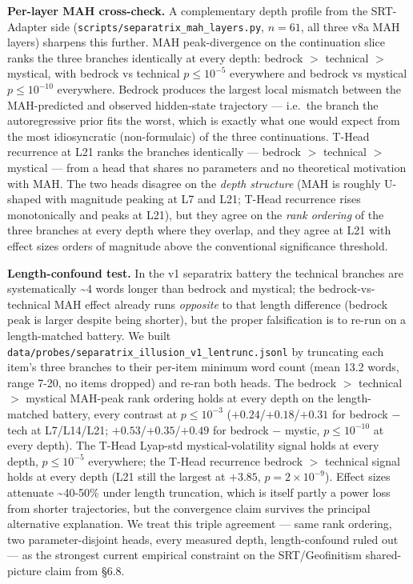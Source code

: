 \documentclass[
  11pt]{article}
\begin{document}
\textbf{Per-layer MAH cross-check.} A complementary depth profile from
the SRT-Adapter side (\texttt{scripts/separatrix\_mah\_layers.py},
\(n = 61\), all three v8a MAH layers) sharpens this further. MAH
peak-divergence on the continuation slice ranks the three branches
identically at every depth: bedrock \(>\) technical \(>\) mystical, with
bedrock vs technical \(p \le 10^{-5}\) everywhere and bedrock vs
mystical \(p \le 10^{-10}\) everywhere. Bedrock produces the largest
local mismatch between the MAH-predicted and observed hidden-state
trajectory --- i.e.~the branch the autoregressive prior fits the worst,
which is exactly what one would expect from the most idiosyncratic
(non-formulaic) of the three continuations. T-Head recurrence at L21
ranks the branches identically --- bedrock \(>\) technical \(>\)
mystical --- from a head that shares no parameters and no theoretical
motivation with MAH. The two heads disagree on the \emph{depth
structure} (MAH is roughly U-shaped with magnitude peaking at L7 and
L21; T-Head recurrence rises monotonically and peaks at L21), but they
agree on the \emph{rank ordering} of the three branches at every depth
where they overlap, and they agree at L21 with effect sizes orders of
magnitude above the conventional significance threshold.

\textbf{Length-confound test.} In the v1 separatrix battery the
technical branches are systematically \textasciitilde4 words longer than
bedrock and mystical; the bedrock-vs-technical MAH effect already runs
\emph{opposite} to that length difference (bedrock peak is larger
despite being shorter), but the proper falsification is to re-run on a
length-matched battery. We built
\texttt{data/probes/separatrix\_illusion\_v1\_lentrunc.jsonl} by
truncating each item's three branches to their per-item minimum word
count (mean 13.2 words, range 7-20, no items dropped) and re-ran both
heads. The bedrock \(>\) technical \(>\) mystical MAH-peak rank ordering
holds at every depth on the length-matched battery, every contrast at
\(p \le 10^{-3}\) (\(+0.24\)/\(+0.18\)/\(+0.31\) for bedrock \(-\) tech
at L7/L14/L21; \(+0.53\)/\(+0.35\)/\(+0.49\) for bedrock \(-\) mystic,
\(p \le 10^{-10}\) at every depth). The T-Head Lyap-std
mystical-volatility signal holds at every depth, \(p \le 10^{-5}\)
everywhere; the T-Head recurrence bedrock \(>\) technical signal holds
at every depth (L21 still the largest at \(+3.85\),
\(p = 2 \times 10^{-9}\)). Effect sizes attenuate \textasciitilde40-50\%
under length truncation, which is itself partly a power loss from
shorter trajectories, but the convergence claim survives the principal
alternative explanation. We treat this triple agreement --- same rank
ordering, two parameter-disjoint heads, every measured depth,
length-confound ruled out --- as the strongest current empirical
constraint on the SRT/Geofinitism shared-picture claim from §6.8.
\end{document}
